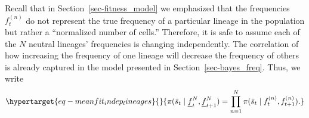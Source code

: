 \documentclass[
  letterpaper,
  DIV=11,
  numbers=noendperiod]{scrartcl}
\begin{document}
\begin{refsegment}
Recall that in Section~\ref{sec-fitness_model} we emphasized that the
frequencies \(f_t^{(n)}\) do not represent the true frequency of a
particular lineage in the population but rather a ``normalized number of
cells.'' Therefore, it is safe to assume each of the \(N\) neutral
lineages' frequencies is changing independently. The correlation of how
increasing the frequency of one lineage will decrease the frequency of
others is already captured in the model presented in
Section~\ref{sec-bayes_freq}. Thus, we write
\begin{equation}\protect\hypertarget{eq-meanfit_indep_lineages}{}{
\pi(\bar{s}_t \mid \underline{f}_t^N, \underline{f}_{t+1}^N) =
\prod_{n=1}^N \pi(\bar{s}_t \mid f_t^{(n)}, f_{t+1}^{(n)}).
}\label{eq-meanfit_indep_lineages}\end{equation}


\end{refsegment}
\end{document}
